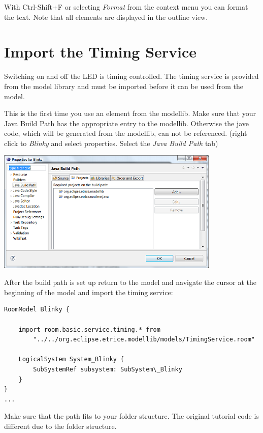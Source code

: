 With Ctrl-Shift+F or selecting \textit{Format} from the context menu you can format the text. Note that all elements are displayed in the outline view.

\section{Import the Timing Service}

Switching on and off the LED is timing controlled. The timing service is provided from the model library and must be imported before it can be used from the model.

This is the first time you use an element from the modellib. Make sure that your Java Build Path has the appropriate entry to the modellib. Otherwise the jave code, which will be generated from the modellib, can not be referenced.
(right click to \textit{Blinky} and select properties. Select the \textit{Java Build Path} tab) 
  
\includegraphics[width=0.8\textwidth]{images/020-Blinky16.png}

After the build path is set up return to the model and navigate the cursor at the beginning of the model and import the timing service: 

\begin{small}
\begin{verbatim}
RoomModel Blinky {
    
    import room.basic.service.timing.* from 
		"../../org.eclipse.etrice.modellib/models/TimingService.room" 
    
    LogicalSystem System_Blinky {
        SubSystemRef subsystem: SubSystem\_Blinky
    }
}
...     
\end{verbatim}
\end{small}

Make sure that the path fits to your folder structure. The original tutorial code is different due to the folder structure.  

